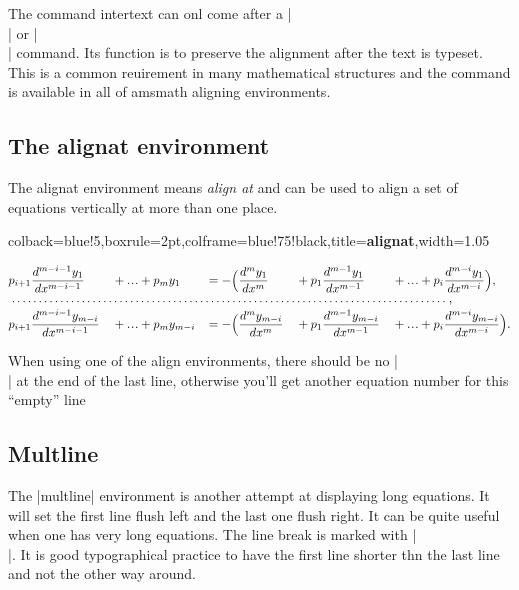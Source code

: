The command intertext can onl come after a |\\| or |\\| command. Its function is to preserve the alignment after the text is typeset. This is a common reuirement in many mathematical structures and the command is available in all of amsmath aligning environments.






\subsection{The alignat environment}
The alignat environment means \emph{align at} and can be used to align a set of equations vertically at more than one place.



\begin{tcblisting}{colback=blue!5,boxrule=2pt,colframe=blue!75!black,title=\textbf{alignat},width=1.05\textwidth}
\renewcommand{\dotsb}{\ldots}			%
\renewcommand{\dotsbsmall}{\ldot\!\ldot\!\ldot}
\renewcommand{\ldot}{\mathbin{.}}			%
\renewcommand{\nobf}[1]{\no \textbf{#1}}	

\begin{alignat*}{5}
  &p_{i+1}\dfrac{d^{m-i-1}y_1}{dx^{m-i-1}} &&+ \dotsbsmall +p_{m}y_1
  && = -\Big(\dfrac{d^{m}y_1}{dx^{m}} &&+p_1\dfrac{d^{m-1}y_1}{dx^{m-1}}
  &&+ \dotsbsmall +p_{i}\dfrac{d^{m-i}y_1}{dx^{m-i}}\Big), \\
\multispan{10}{\makebox[36em]{\dotfill},}\\
 &p_{i+1}\dfrac{d^{m-i-1}y_{m-i}}{dx^{m-i-1}} &&+ \dotsbsmall +p_{m}y_{m-i}\!
 &&= -\Big(\dfrac{d^{m}y_{m-i}}{dx^{m}} &&+ p_1\dfrac{d^{m-1}y_{m-i}}{dx^{m-1}}
 &&+ \dotsbsmall +p_{i}\dfrac{d^{m-i}y_{m-i}}{dx^{m-i}}\Big).
\end{alignat*}
\end{tcblisting}



When using one of the align environments, there should be no |\\| at the end of the
last line, otherwise you’ll get another equation number for this ``empty''  line


\clearpage
\subsection{Multline}
The |multline| environment is another attempt at displaying long equations. It will set the first line flush left and the last one flush right. It can be quite useful when one has very long equations. The line break is marked with |\\|. It is good typographical practice to have the first line shorter thn the last line and not the other way around.

